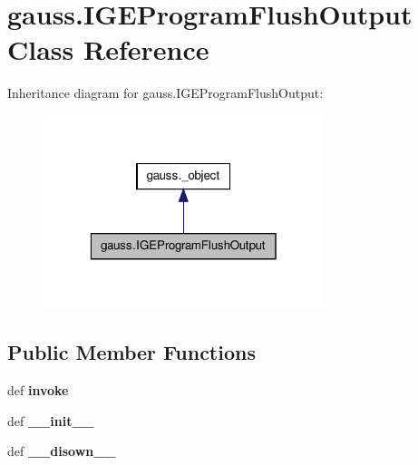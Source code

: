 \hypertarget{classgauss_1_1_i_g_e_program_flush_output}{\section{gauss.\-I\-G\-E\-Program\-Flush\-Output Class Reference}
\label{classgauss_1_1_i_g_e_program_flush_output}
}


Inheritance diagram for gauss.\-I\-G\-E\-Program\-Flush\-Output\-:\nopagebreak
\begin{figure}[H]
\begin{center}
\leavevmode
\includegraphics[width=232pt]{classgauss_1_1_i_g_e_program_flush_output__inherit__graph}
\end{center}
\end{figure}
\subsection*{Public Member Functions}
\begin{DoxyCompactItemize}
\item 
\hypertarget{classgauss_1_1_i_g_e_program_flush_output_a6a9d677dbfae47a468cd1198b8cbc1d3}{def {\bfseries invoke}}\label{classgauss_1_1_i_g_e_program_flush_output_a6a9d677dbfae47a468cd1198b8cbc1d3}

\item 
\hypertarget{classgauss_1_1_i_g_e_program_flush_output_aaa063a58fff870d000953d5a18c2be9f}{def {\bfseries \-\_\-\-\_\-init\-\_\-\-\_\-}}\label{classgauss_1_1_i_g_e_program_flush_output_aaa063a58fff870d000953d5a18c2be9f}

\item 
\hypertarget{classgauss_1_1_i_g_e_program_flush_output_a0ca492180ea4bd0e953ecac150737adf}{def {\bfseries \-\_\-\-\_\-disown\-\_\-\-\_\-}}\label{classgauss_1_1_i_g_e_program_flush_output_a0ca492180ea4bd0e953ecac150737adf}

\end{DoxyCompactItemize}
